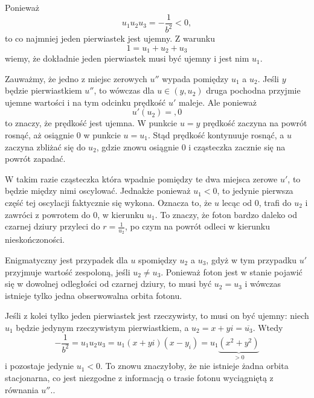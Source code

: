 Ponieważ 
$$u_1u_2u_3=-\frac{1}{b^2}<0,$$ 
to co najmniej jeden pierwiastek jest ujemny. Z warunku 
$$1=u_1+u_2+u_3$$ 
wiemy, że dokładnie jeden pierwiastek musi być ujemny i jest nim $u_1$. 

Zauważmy, że jedno z miejsc zerowych $u''$ wypada pomiędzy $u_1$ a $u_2$. Jeśli $y$ będzie pierwiastkiem $u''$, to wówczas dla $u\in (y, u_2)$ druga pochodna przyjmie ujemne wartości i na tym odcinku prędkość $u'$ maleje. Ale ponieważ 
$$u'(u_2)=,0$$ 
to znaczy, że prędkość jest ujemna. W punkcie $u=y$ prędkość zaczyna na powrót rosnąć, aż osiągnie $0$ w punkcie $u=u_1$. Stąd prędkość kontynuuje rosnąć, a $u$ zaczyna zbliżać się do $u_2$, gdzie znowu osiągnie $0$ i cząsteczka zacznie się na powrót zapadać. 

W takim razie cząsteczka która wpadnie pomiędzy te dwa miejsca zerowe $u'$, to będzie między nimi oscylować. Jednakże ponieważ $u_1<0$, to jedynie pierwsza część tej oscylacji faktycznie się wykona. Oznacza to, że $u$ lecąc od $0$, trafi do $u_2$ i zawróci z powrotem do $0$, w kierunku $u_1$. To znaczy, że foton bardzo daleko od czarnej dziury przyleci do $r=\frac{1}{u_2}$, po czym na powrót odleci w kierunku nieskończoności.

Enigmatyczny jest przypadek dla $u$ spomiędzy $u_2$ a $u_3$, gdyż w tym przypadku $u'$ przyjmuje wartość zespoloną, jeśli $u_2\neq u_3$. Ponieważ foton jest w stanie pojawić się w dowolnej odległości od czarnej dziury, to musi być $u_2=u_3$ i wówczas istnieje tylko jedna obserwowalna orbita fotonu.

Jeśli z kolei tylko jeden pierwiastek jest rzeczywisty, to musi on być ujemny: niech $u_1$ będzie jedynym rzeczywistym pierwiastkiem, a $u_2=x+yi=\overline{u_3}$. Wtedy
$$-\frac{1}{b^2}=u_1u_2u_3=u_1(x+yi)(x-y_i)=u_1\underbrace{(x^2+y^2)}_{>0}$$
i pozostaje jedynie $u_1<0$. To znowu znaczyłoby, że nie istnieje żadna orbita stacjonarna, co jest niezgodne z informacją o trasie fotonu wyciągniętą z równania $u''$..
